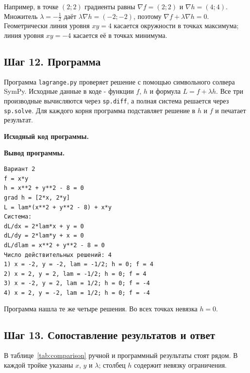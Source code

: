 \documentclass[a4paper,12pt]{article}
\begin{document}
Например, в точке $(2;2)$ градиенты равны $\nabla f=(2;2)$ и $\nabla h=(4;4)$. Множитель $\lambda=-\frac12$ даёт $\lambda\nabla h=(-2;-2)$, поэтому $\nabla f+\lambda\nabla h=0$. Геометрически линия уровня $xy=4$ касается окружности в точках максимума; линия уровня $xy=-4$ касается её в точках минимума.

\subsection*{Шаг 12. Программа}

Программа \texttt{lagrange.py} проверяет решение с помощью символьного солвера SymPy. Исходные данные в коде - функции $f$, $h$ и формула $L=f+\lambda h$. Все три производные вычисляются через \texttt{sp.diff}, а полная система решается через \texttt{sp.solve}. Для каждого корня программа подставляет решение в $h$ и $f$ и печатает результат.

\begin{minipage}{\textwidth}
\textbf{Исходный код программы.}

\begingroup
\footnotesize\singlespacing

\endgroup
\end{minipage}

\textbf{Вывод программы.}

\begin{minipage}{\textwidth}
\begingroup
\footnotesize\singlespacing
\begin{verbatim}
Вариант 2
f = x*y
h = x**2 + y**2 - 8 = 0
grad h = [2*x, 2*y]
L = lam*(x**2 + y**2 - 8) + x*y
Система:
dL/dx = 2*lam*x + y = 0
dL/dy = 2*lam*y + x = 0
dL/dlam = x**2 + y**2 - 8 = 0
Число действительных решений: 4
1) x = -2, y = -2, lam = -1/2; h = 0; f = 4
2) x = 2, y = 2, lam = -1/2; h = 0; f = 4
3) x = -2, y = 2, lam = 1/2; h = 0; f = -4
4) x = 2, y = -2, lam = 1/2; h = 0; f = -4
\end{verbatim}
\endgroup
\end{minipage}

Программа нашла те же четыре решения. Во всех точках невязка $h=0$.

\newpage
\subsection*{Шаг 13. Сопоставление результатов и ответ}

В таблице~\ref{tab:comparison} ручной и программный результаты стоят рядом. В каждой тройке указаны $x$, $y$ и $\lambda$; столбец $h$ содержит невязку ограничения.
\end{document}
